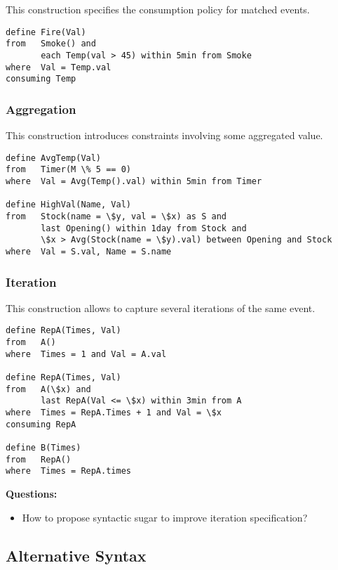 This construction specifies the consumption policy for matched events.

\begin{lstlisting}[language=iotdsl]
define Fire(Val)
from   Smoke() and 
       each Temp(val > 45) within 5min from Smoke
where  Val = Temp.val
consuming Temp
\end{lstlisting}


\subsubsection{Aggregation}
\label{sec:Aggregation}

This construction introduces constraints involving some aggregated value.

\begin{lstlisting}[language=iotdsl]
define AvgTemp(Val)
from   Timer(M \% 5 == 0)
where  Val = Avg(Temp().val) within 5min from Timer

define HighVal(Name, Val)
from   Stock(name = \$y, val = \$x) as S and
       last Opening() within 1day from Stock and
       \$x > Avg(Stock(name = \$y).val) between Opening and Stock
where  Val = S.val, Name = S.name
\end{lstlisting}

\subsubsection{Iteration}
\label{sec:Iteration}

This construction allows to capture several iterations of the same event.

\begin{lstlisting}[language=iotdsl]
define RepA(Times, Val)
from   A()
where  Times = 1 and Val = A.val

define RepA(Times, Val)
from   A(\$x) and 
       last RepA(Val <= \$x) within 3min from A
where  Times = RepA.Times + 1 and Val = \$x
consuming RepA

define B(Times)
from   RepA()
where  Times = RepA.times
\end{lstlisting}

\medskip
\noindent
\textbf{Questions:}
\begin{itemize}
	\item How to propose syntactic sugar to improve iteration specification?
\end{itemize}

\subsection{Alternative Syntax}
\label{sec:AS}

